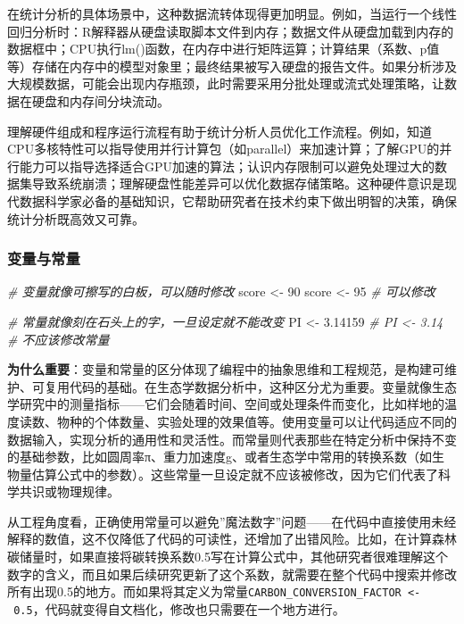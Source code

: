\documentclass[
]{book}
\newenvironment{Shaded}{\begin{snugshade}}{\end{snugshade}}
\newcommand{\CommentTok}[1]{\textcolor[rgb]{0.56,0.35,0.01}{\textit{#1}}}
\newcommand{\DecValTok}[1]{\textcolor[rgb]{0.00,0.00,0.81}{#1}}
\newcommand{\FloatTok}[1]{\textcolor[rgb]{0.00,0.00,0.81}{#1}}
\newcommand{\NormalTok}[1]{#1}
\newcommand{\OtherTok}[1]{\textcolor[rgb]{0.56,0.35,0.01}{#1}}
\begin{document}
在统计分析的具体场景中，这种数据流转体现得更加明显。例如，当运行一个线性回归分析时：R解释器从硬盘读取脚本文件到内存；数据文件从硬盘加载到内存的数据框中；CPU执行lm()函数，在内存中进行矩阵运算；计算结果（系数、p值等）存储在内存中的模型对象里；最终结果被写入硬盘的报告文件。如果分析涉及大规模数据，可能会出现内存瓶颈，此时需要采用分批处理或流式处理策略，让数据在硬盘和内存间分块流动。

理解硬件组成和程序运行流程有助于统计分析人员优化工作流程。例如，知道CPU多核特性可以指导使用并行计算包（如parallel）来加速计算；了解GPU的并行能力可以指导选择适合GPU加速的算法；认识内存限制可以避免处理过大的数据集导致系统崩溃；理解硬盘性能差异可以优化数据存储策略。这种硬件意识是现代数据科学家必备的基础知识，它帮助研究者在技术约束下做出明智的决策，确保统计分析既高效又可靠。

\hypertarget{ux53d8ux91cfux4e0eux5e38ux91cf}{%
\subsubsection{变量与常量}\label{ux53d8ux91cfux4e0eux5e38ux91cf}}

\begin{Shaded}
\begin{Highlighting}[]
\CommentTok{\# 变量就像可擦写的白板，可以随时修改}
\NormalTok{score }\OtherTok{\textless{}{-}} \DecValTok{90}
\NormalTok{score }\OtherTok{\textless{}{-}} \DecValTok{95}  \CommentTok{\# 可以修改}

\CommentTok{\# 常量就像刻在石头上的字，一旦设定就不能改变}
\NormalTok{PI }\OtherTok{\textless{}{-}} \FloatTok{3.14159}
\CommentTok{\# PI \textless{}{-} 3.14  \# 不应该修改常量}
\end{Highlighting}
\end{Shaded}

\textbf{为什么重要}：变量和常量的区分体现了编程中的抽象思维和工程规范，是构建可维护、可复用代码的基础。在生态学数据分析中，这种区分尤为重要。变量就像生态学研究中的测量指标------它们会随着时间、空间或处理条件而变化，比如样地的温度读数、物种的个体数量、实验处理的效果值等。使用变量可以让代码适应不同的数据输入，实现分析的通用性和灵活性。而常量则代表那些在特定分析中保持不变的基础参数，比如圆周率π、重力加速度g、或者生态学中常用的转换系数（如生物量估算公式中的参数）。这些常量一旦设定就不应该被修改，因为它们代表了科学共识或物理规律。

从工程角度看，正确使用常量可以避免''魔法数字''问题------在代码中直接使用未经解释的数值，这不仅降低了代码的可读性，还增加了出错风险。比如，在计算森林碳储量时，如果直接将碳转换系数0.5写在计算公式中，其他研究者很难理解这个数字的含义，而且如果后续研究更新了这个系数，就需要在整个代码中搜索并修改所有出现0.5的地方。而如果将其定义为常量\texttt{CARBON\_CONVERSION\_FACTOR\ \textless{}-\ 0.5}，代码就变得自文档化，修改也只需要在一个地方进行。
\end{document}
